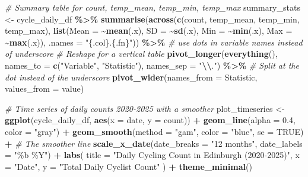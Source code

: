 \documentclass[
]{article}
\newenvironment{Shaded}{\begin{snugshade}}{\end{snugshade}}
\newcommand{\AttributeTok}[1]{\textcolor[rgb]{0.13,0.29,0.53}{#1}}
\newcommand{\CommentTok}[1]{\textcolor[rgb]{0.56,0.35,0.01}{\textit{#1}}}
\newcommand{\ConstantTok}[1]{\textcolor[rgb]{0.56,0.35,0.01}{#1}}
\newcommand{\FloatTok}[1]{\textcolor[rgb]{0.00,0.00,0.81}{#1}}
\newcommand{\FunctionTok}[1]{\textcolor[rgb]{0.13,0.29,0.53}{\textbf{#1}}}
\newcommand{\NormalTok}[1]{#1}
\newcommand{\OtherTok}[1]{\textcolor[rgb]{0.56,0.35,0.01}{#1}}
\newcommand{\SpecialCharTok}[1]{\textcolor[rgb]{0.81,0.36,0.00}{\textbf{#1}}}
\newcommand{\StringTok}[1]{\textcolor[rgb]{0.31,0.60,0.02}{#1}}
\begin{document}
\begin{Shaded}
\begin{Highlighting}[]
\CommentTok{\# Summary table for count, temp\_mean, temp\_min, temp\_max}
\NormalTok{summary\_stats }\OtherTok{\textless{}{-}}\NormalTok{ cycle\_daily\_df }\SpecialCharTok{\%\textgreater{}\%}
  \FunctionTok{summarise}\NormalTok{(}\FunctionTok{across}\NormalTok{(}\FunctionTok{c}\NormalTok{(count, temp\_mean, temp\_min, temp\_max), }
                   \FunctionTok{list}\NormalTok{(}\AttributeTok{Mean =} \SpecialCharTok{\textasciitilde{}}\FunctionTok{mean}\NormalTok{(.x), }
                        \AttributeTok{SD =} \SpecialCharTok{\textasciitilde{}}\FunctionTok{sd}\NormalTok{(.x), }
                        \AttributeTok{Min =} \SpecialCharTok{\textasciitilde{}}\FunctionTok{min}\NormalTok{(.x), }
                        \AttributeTok{Max =} \SpecialCharTok{\textasciitilde{}}\FunctionTok{max}\NormalTok{(.x)),}
                   \AttributeTok{.names =} \StringTok{"\{.col\}.\{.fn\}"}\NormalTok{)) }\SpecialCharTok{\%\textgreater{}\%} \CommentTok{\# use dots in variable names instead of underscore}
  \CommentTok{\# Reshape for a vertical table}
  \FunctionTok{pivot\_longer}\NormalTok{(}\FunctionTok{everything}\NormalTok{(), }
               \AttributeTok{names\_to =} \FunctionTok{c}\NormalTok{(}\StringTok{"Variable"}\NormalTok{, }\StringTok{"Statistic"}\NormalTok{), }
               \AttributeTok{names\_sep =} \StringTok{"}\SpecialCharTok{\textbackslash{}\textbackslash{}}\StringTok{."}\NormalTok{) }\SpecialCharTok{\%\textgreater{}\%} \CommentTok{\# Split at the dot instead of the underscore}
  \FunctionTok{pivot\_wider}\NormalTok{(}\AttributeTok{names\_from =}\NormalTok{ Statistic, }\AttributeTok{values\_from =}\NormalTok{ value)}


\CommentTok{\# Time series of daily counts 2020{-}2025 with a smoother}
\NormalTok{plot\_timeseries }\OtherTok{\textless{}{-}} \FunctionTok{ggplot}\NormalTok{(cycle\_daily\_df, }\FunctionTok{aes}\NormalTok{(}\AttributeTok{x =}\NormalTok{ date, }\AttributeTok{y =}\NormalTok{ count)) }\SpecialCharTok{+}
  \FunctionTok{geom\_line}\NormalTok{(}\AttributeTok{alpha =} \FloatTok{0.4}\NormalTok{, }\AttributeTok{color =} \StringTok{"gray"}\NormalTok{) }\SpecialCharTok{+} 
  \FunctionTok{geom\_smooth}\NormalTok{(}\AttributeTok{method =} \StringTok{"gam"}\NormalTok{, }\AttributeTok{color =} \StringTok{"blue"}\NormalTok{, }\AttributeTok{se =} \ConstantTok{TRUE}\NormalTok{) }\SpecialCharTok{+} \CommentTok{\# The smoother line}
  \FunctionTok{scale\_x\_date}\NormalTok{(}\AttributeTok{date\_breaks =} \StringTok{"12 months"}\NormalTok{, }\AttributeTok{date\_labels =} \StringTok{"\%b \%Y"}\NormalTok{) }\SpecialCharTok{+} 
  \FunctionTok{labs}\NormalTok{(}
    \AttributeTok{title =} \StringTok{"Daily Cycling Count in Edinburgh (2020{-}2025)"}\NormalTok{,}
    \AttributeTok{x =} \StringTok{"Date"}\NormalTok{,}
    \AttributeTok{y =} \StringTok{"Total Daily Cyclist Count"}
\NormalTok{  ) }\SpecialCharTok{+}
  \FunctionTok{theme\_minimal}\NormalTok{()}


\end{Highlighting}
\end{Shaded}
\end{document}
